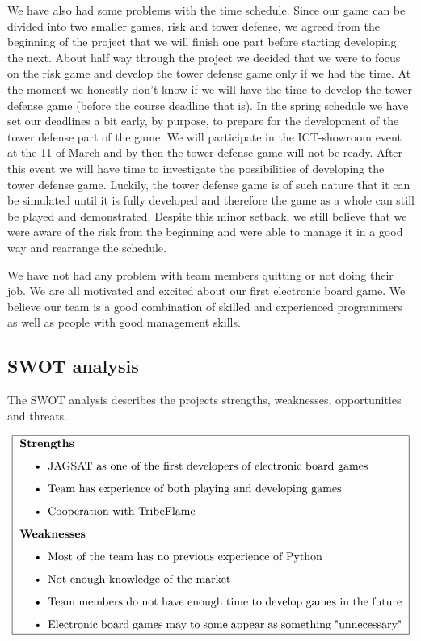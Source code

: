 \documentclass[12pt,a4paper]{article}
\begin{document}
We have also had some problems with the time schedule. Since our game can be divided into two smaller games, risk and tower defense, we agreed from the beginning of the project that we will finish one part before starting developing the next. About half way through the project we decided that we were to focus on the risk game and develop the tower defense game only if we had the time. At the moment we honestly don't know if we will have the time to develop the tower defense game (before the course deadline that is). In the spring schedule we have set our deadlines a bit early, by purpose, to prepare for the development of the tower defense part of the game. We will participate in the ICT-showroom event at the 11 of March and by then the tower defense game will not be ready. After this event we will have time to investigate the possibilities of developing the tower defense game. Luckily, the tower defense game is of such nature that it can be simulated until it is fully developed and therefore the game as a whole can still be played and demonstrated. Despite this minor setback, we still believe that we were aware of the risk from the beginning and were able to manage it in a good way and rearrange the schedule.

We have not had any problem with team members quitting or not doing their job. We are all motivated and excited about our first electronic board game. We believe our team is a good combination of skilled and experienced programmers as well as people with good management skills.

\subsection{SWOT analysis}
The SWOT analysis describes the projects strengths, weaknesses, opportunities and threats.

\[
\fbox{
\addtolength{\linewidth}{-2\fboxsep}%
\addtolength{\linewidth}{-2\fboxrule}%
\begin{minipage}{\linewidth}
{\bf Strengths}
\begin{itemize}
\item JAGSAT as one of the first developers of  electronic board games
\item Team has experience of both playing and developing games
\item Cooperation with TribeFlame
\end{itemize}

{\bf Weaknesses}
\begin{itemize}
\item Most of the team has no previous experience of Python
\item Not enough knowledge of the market
\item Team members do not have enough time to develop games in the future
\item Electronic board games may to some appear as something "unnecessary"
\end{itemize}
\end{minipage}
}
\]
\end{document}
